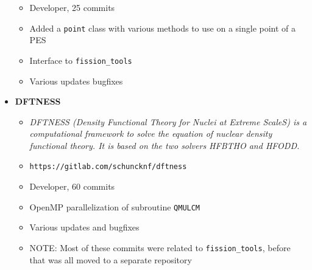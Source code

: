 \begin{itemize}
\begin{itemize}
		\item Developer, 25 commits
		\item Added a \verb|point| class with various methods to use on a single point of a PES
		\item Interface to \verb|fission_tools|
		\item Various updates bugfixes
	\end{itemize}
	\item \textbf{DFTNESS}
	\begin{itemize}
		\item \textit{DFTNESS (Density Functional Theory for Nuclei at Extreme ScaleS) is a computational framework to solve the equation of nuclear density functional theory. It is based on the two solvers HFBTHO and HFODD.}
		\item \verb|https://gitlab.com/schuncknf/dftness|
		\item Developer, 60 commits
		\item OpenMP parallelization of subroutine \verb|QMULCM|
		\item Various updates and bugfixes
		\item NOTE: Most of these commits were related to \verb|fission_tools|, before that was all moved to a separate repository
	\end{itemize}
\end{itemize}